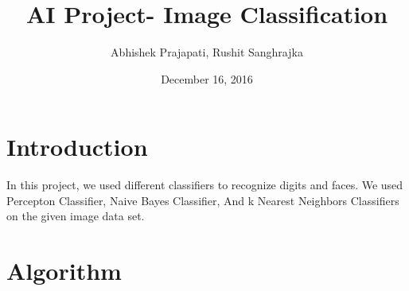 \documentclass{article}
\title{AI Project- Image Classification}
\author{Abhishek Prajapati, Rushit Sanghrajka}
\date{December 16, 2016}
\begin{document}
\maketitle

\section{Introduction}
    \qquad In this project, we used different classifiers to recognize digits and faces.  We used Percepton Classifier, Naive Bayes Classifier, And k Nearest Neighbors Classifiers on the given image data set.
    
\section{Algorithm}
\end{document}
